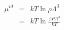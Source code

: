 \documentclass[12pt]{article}
\begin{document}
\begin{eqnarray*}
\mu^{id} &=& k T \ln{\rho \Lambda^3} \\
&=& k T \ln{\frac{\phi P \Lambda^3}{k T}} 
\end{eqnarray*}
\end{document}
